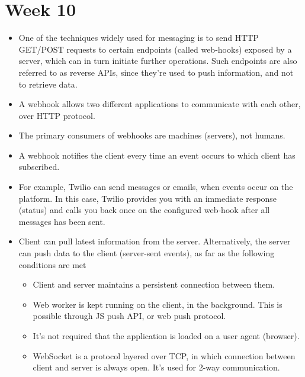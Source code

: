 \documentclass[a4paper]{article}
\begin{document}
\section{Week 10}
\begin{itemize}
    \item One of the techniques widely used for messaging is to send HTTP GET/POST requests to certain endpoints (called web-hooks) exposed by a server, which can in turn initiate further operations. Such endpoints are also referred to as reverse APIs, since they’re used to push information, and not to retrieve data. 
    \item A webhook allows two different applications to communicate with each other, over HTTP protocol.
    \item The primary consumers of webhooks are machines  (servers), not humans.
    \item A webhook notifies the client every time an event occurs to which client has subscribed.
    \item For example, Twilio can send messages or emails, when events occur on the platform. In this case, Twilio provides you with an immediate response (status) and calls you back  once on the configured web-hook after all messages has been sent.
    \item Client can pull latest information from the server. Alternatively, the server can push data to the client (server-sent events), as far as the following conditions are met
    \begin{itemize}
        \item Client and server maintains a persistent connection between them. 
        \item Web worker is kept running on the client, in the background.  This is possible through JS push API, or web push protocol.
        \item It’s not required that the application is loaded on a user agent (browser).
        \item WebSocket is a protocol layered over TCP, in which connection between client and server is always open. It’s used for 2-way communication.
    \end{itemize}
\end{itemize}
\end{document}
